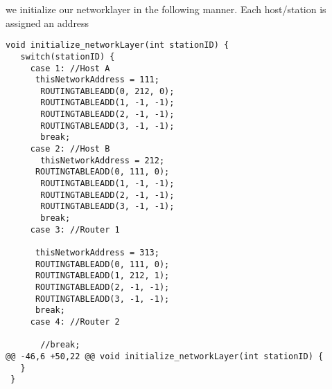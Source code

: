we initialize our networklayer in the following manner.
Each host/station is assigned an address

\begin{lstlisting}
void initialize_networkLayer(int stationID) {
   switch(stationID) {
     case 1: //Host A
      thisNetworkAddress = 111;
       ROUTINGTABLEADD(0, 212, 0);
       ROUTINGTABLEADD(1, -1, -1);
       ROUTINGTABLEADD(2, -1, -1);
       ROUTINGTABLEADD(3, -1, -1);
       break;
     case 2: //Host B
       thisNetworkAddress = 212;
      ROUTINGTABLEADD(0, 111, 0);
       ROUTINGTABLEADD(1, -1, -1);
       ROUTINGTABLEADD(2, -1, -1);
       ROUTINGTABLEADD(3, -1, -1);
       break;
     case 3: //Router 1

      thisNetworkAddress = 313;
      ROUTINGTABLEADD(0, 111, 0);
      ROUTINGTABLEADD(1, 212, 1);
      ROUTINGTABLEADD(2, -1, -1);
      ROUTINGTABLEADD(3, -1, -1);
      break;
     case 4: //Router 2

       //break;
@@ -46,6 +50,22 @@ void initialize_networkLayer(int stationID) {
   }
 }
\end{lstlisting}



\hfill \break
